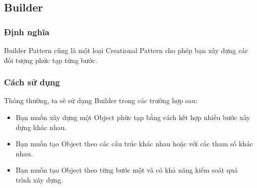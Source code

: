\subsection{Builder}
\subsubsection{Định nghĩa}
Builder Pattern cũng là một loại Creational Pattern cho phép bạn xây dựng các đối tượng phức tạp từng bước.
\subsubsection{Cách sử dụng}
Thông thường, ta sẽ sử dụng Builder trong các trường hợp sau:
\begin{itemize}
    \item Bạn muốn xây dựng một Object phức tạp bằng cách kết hợp nhiều bước xây dựng khác nhau.
    \item Bạn muốn tạo Object theo các cấu trúc khác nhau hoặc với các tham số khác nhau.
    \item Bạn muốn tạo Object theo từng bước một và có khả năng kiểm soát quá trình xây dựng.
\end{itemize}
